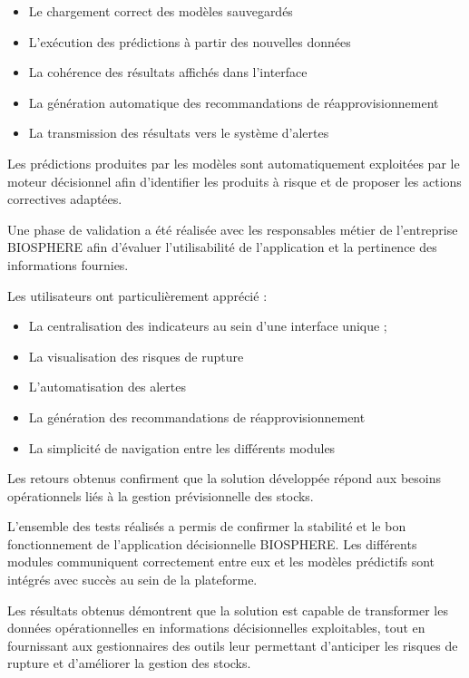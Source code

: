 \begin{itemize}
    \item Le chargement correct des modèles sauvegardés 
    \item L'exécution des prédictions à partir des nouvelles données 
    \item La cohérence des résultats affichés dans l'interface 
    \item La génération automatique des recommandations de réapprovisionnement 
    \item La transmission des résultats vers le système d'alertes
\end{itemize}

Les prédictions produites par les modèles sont automatiquement exploitées par le moteur décisionnel afin d'identifier les produits à risque et de proposer les actions correctives adaptées.

Une phase de validation a été réalisée avec les responsables métier de l'entreprise BIOSPHERE afin d'évaluer l'utilisabilité de l'application et la pertinence des informations fournies.

Les utilisateurs ont particulièrement apprécié :

\begin{itemize}
    \item La centralisation des indicateurs au sein d'une interface unique ;
    \item La visualisation des risques de rupture 
    \item L'automatisation des alertes 
    \item La génération des recommandations de réapprovisionnement 
    \item La simplicité de navigation entre les différents modules
\end{itemize}

Les retours obtenus confirment que la solution développée répond aux besoins opérationnels liés à la gestion prévisionnelle des stocks.

L'ensemble des tests réalisés a permis de confirmer la stabilité et le bon fonctionnement de l'application décisionnelle BIOSPHERE. Les différents modules communiquent correctement entre eux et les modèles prédictifs sont intégrés avec succès au sein de la plateforme.

Les résultats obtenus démontrent que la solution est capable de transformer les données opérationnelles en informations décisionnelles exploitables, tout en fournissant aux gestionnaires des outils leur permettant d'anticiper les risques de rupture et d'améliorer la gestion des stocks.

